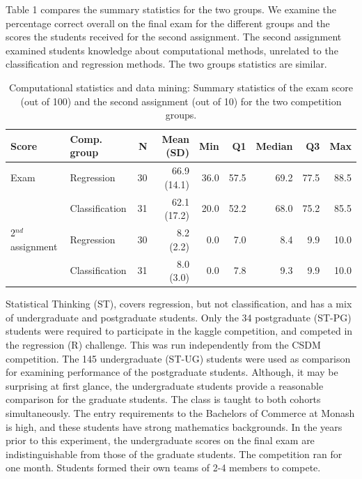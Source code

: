 \documentclass[12pt]{article}
\begin{document}
Table 1 compares the summary statistics for the two groups. We examine
the percentage correct overall on the final exam for the different
groups and the scores the students received for the second assignment.
The second assignment examined students knowledge about computational
methods, unrelated to the classification and regression methods. The two
groups statistics are similar.

\begin{table}[h]
\begin{center}
\begin{tabular}{l l | r | r | r r r r r}\hline
Score & Comp. group & N & Mean (SD)   & Min  &  Q1 & Median  &  Q3  & Max \\\hline
Exam   & Regression      & 30 &  66.9 (14.1)  &   36.0 &  57.5 &   69.2 &  77.5 &   88.5\\
       & Classification & 31 &  62.1 (17.2)  &   20.0  & 52.2  &  68.0   &  75.2 &  85.5\\\hline

2$^{nd}$ assignment & Regression      &    30  & 8.2 (2.2)  &  0.0  & 7.0 &  8.4   &  9.9  &   10.0 \\
                    & Classification  &    31  & 8.0 (3.0)  &  0.0  & 7.8  &  9.3   &  9.9  &   10.0 \\\hline

\end{tabular}
\caption{Computational statistics and data mining: Summary statistics of the exam score (out of 100) and the second assignment (out of 10) for the two competition groups.}
\end{center}
\label{tab:Melb_Group_Compare}
\end{table}

Statistical Thinking (ST), covers regression, but not classification,
and has a mix of undergraduate and postgraduate students. Only the 34
postgraduate (ST-PG) students were required to participate in the kaggle
competition, and competed in the regression (R) challenge. This was run
independently from the CSDM competition. The 145 undergraduate (ST-UG)
students were used as comparison for examining performance of the
postgraduate students. Although, it may be surprising at first glance,
the undergraduate students provide a reasonable comparison for the
graduate students. The class is taught to both cohorts simultaneously.
The entry requirements to the Bachelors of Commerce at Monash is high,
and these students have strong mathematics backgrounds. In the years
prior to this experiment, the undergraduate scores on the final exam are
indistinguishable from those of the graduate students. The competition
ran for one month. Students formed their own teams of 2-4 members to
compete.
\end{document}
